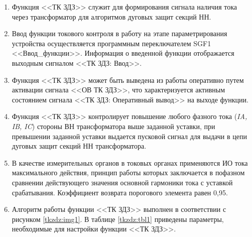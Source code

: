 \documentclass[a4paper, 12pt,table, hidelinks, DIV=calc]{extarticle} %
\begin{document}
\color{black}

\begin{enumerate}[label=\arabic{section}.\arabic{subsection}.\arabic*, labelsep=4pt, leftmargin=0pt, itemindent=57pt]

\item
Функция <<ТК ЗДЗ>> служит для формирования сигнала наличия тока через трансформатор для алгоритмов дуговых защит секций НН. 
\item
Ввод функции токового контроля в работу на этапе параметрирования устройства осуществляется программным переключателем SGF1 <<Ввод\_функции>>. Информация о введенной функции отображается выходным сигналом <<ТК ЗДЗ: Ввод>>.
\item
Функция <<ТК ЗДЗ>> может быть выведена из работы оперативно путем активации сигнала <<ОВ ТК ЗДЗ>>, что характеризуется активным состоянием сигнала <<ТК ЗДЗ: Оперативный вывод>> на выходе функции.
\item
Функция <<ТК ЗДЗ>> контролирует повышение любого фазного тока (\textsl{IA, IB, IC}) стороны ВН трансформатора выше заданной уставки, при превышении заданной уставки выдается пусковой сигнал для выдачи в цепи дуговых защит секций НН трансформатора.
\item
В качестве измерительных органов в токовых органах применяются ИО тока максимального действия, принцип работы которых заключается в пофазном сравнении действующего значения основной гармоники тока с уставкой срабатывания. Коэффициент возврата порогового элемента равен 0,95.

\item
Алгоритм работы функции <<ТК ЗДЗ>> выполнен в соответствии с рисунком \ref{tkzdz:img1}. В таблице \ref{tkzdz:tbl1} приведены параметры, необходимые для настройки функции <<ТК ЗДЗ>>.


\end{enumerate}
\end{document}
